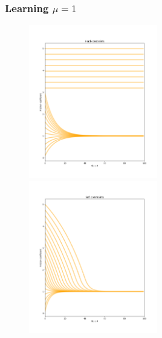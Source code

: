 \documentclass{beamer}
\begin{document}
\begin{frame}
    \frametitle{Learning $\mu=1$}
    \begin{figure}
        \includegraphics[width=0.5\textwidth]{hard_constraints.png}%
        \includegraphics[width=0.5\textwidth]{soft_constraints.png}
    \end{figure}
\end{frame}
\end{document}
